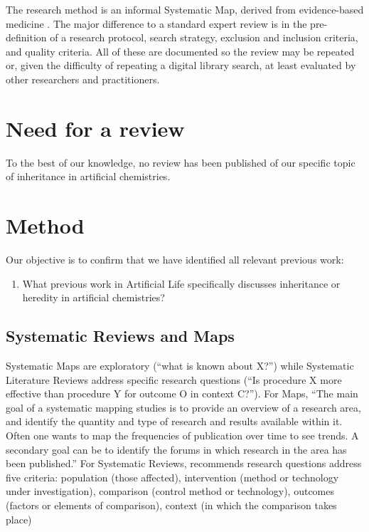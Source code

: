 The research method is an informal Systematic Map, derived from evidence-based medicine \parencite{Cochrane:2011qy, CRD:2008fj}. The major difference to a standard expert review is in the pre-definition of a research protocol, search strategy, exclusion and inclusion criteria, and quality criteria. All of these are documented so the review may be repeated or, given the difficulty of repeating a digital library search, at least evaluated by other researchers and practitioners.

\section{Need for a review}

To the best of our knowledge, no review has been published of our specific topic of inheritance in artificial chemistries.

\section{Method}
Our objective is to confirm that we have identified all relevant previous work:

\begin{enumerate}[label=RQ\arabic*:]
	\item What previous work in Artificial Life specifically discusses inheritance or heredity in artificial chemistries?
\end{enumerate}

\subsection{Systematic Reviews and Maps}

Systematic Maps \parencite{Petersen:2008fk} are exploratory (``what is known about X?'') while Systematic Literature Reviews \parencite{Kitchenham:2007nx} address specific research questions (``Is procedure X more effective than procedure Y for outcome O in context C?''). For Maps, ``The main goal of a systematic mapping studies is to provide an overview of a research area, and identify the quantity and type of research and results available within it. Often one wants to map the frequencies of publication over time to see trends. A secondary goal can be to identify the forums in which research in the area has been published.'' \parencite{Petersen:2008fk} For Systematic Reviews, \cite{Kitchenham:2007nx} recommends research questions address five criteria: population (those affected), intervention (method or technology under investigation), comparison (control method or technology), outcomes (factors or elements of comparison), context (in which the comparison takes place)

